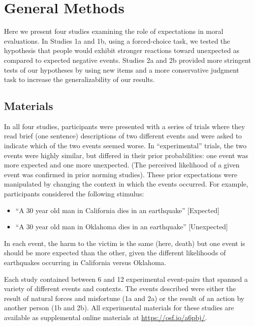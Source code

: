 \documentclass[10pt, letterpaper]{article}
\begin{document}
\section{General Methods}\label{general-methods}

Here we present four studies examining the role of expectations in moral
evaluations. In Studies 1a and 1b, using a forced-choice task, we tested
the hypothesis that people would exhibit stronger reactions toward
unexpected as compared to expected negative events. Studies 2a and 2b
provided more stringent tests of our hypotheses by using new items and a
more conservative judgment task to increase the generalizability of our
results.

\subsection{Materials}\label{materials}

In all four studies, participants were presented with a series of trials
where they read brief (one sentence) descriptions of two different
events and were asked to indicate which of the two events seemed worse.
In ``experimental'' trials, the two events were highly similar, but
differed in their prior probabilities: one event was more expected and
one more unexpected. (The perceived likelihood of a given event was
confirmed in prior norming studies). These prior expectations were
manipulated by changing the context in which the events occurred. For
example, participants considered the following stimulus:

\begin{itemize}
\item
  ``A 30 year old man in California dies in an earthquake''
  {[}Expected{]}
\item
  ``A 30 year old man in Oklahoma dies in an earthquake''
  {[}Unexpected{]}
\end{itemize}

In each event, the harm to the victim is the same (here, death) but one
event is should be more expected than the other, given the different
likelihoods of earthquakes occurring in California versus Oklahoma.

Each study contained between 6 and 12 experimental event-pairs that
spanned a variety of different events and contexts. The events described
were either the result of natural forces and misfortune (1a and 2a) or
the result of an action by another person (1b and 2b). All experimental
materials for these studies are available as supplemental online
materials at \url{https://osf.io/a6pbj/}.
\end{document}
